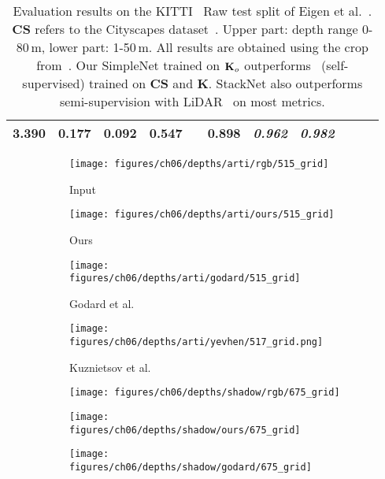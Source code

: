 \documentclass[runningheads]{llncs}
\begin{document}
\begin{table}[tb]
\begin{tabular}{lcccccccccc}
		\textbf{3.390} & \textbf{0.177} & 
		\textbf{0.092} & \textbf{0.547} && 
		\textbf{0.898} & \textit{0.962} & \textit{0.982} \\
		\hline      
	\end{tabular}
	\caption{
	Evaluation results on the KITTI~\cite{Geiger2012CVPR} Raw test split 
		of Eigen et 
		al.~\cite{eigen2014depth}. \textbf{CS} refers to the Cityscapes 
		dataset~\cite{Cordts2016Cityscapes}. Upper part: depth range 0-80\,m, 
		lower part: 1-50\,m.
All results are obtained using the crop 
		from~\cite{eigen2014depth}. Our SimpleNet trained on 
		$\text{\textbf{K}}_o$ outperforms~\cite{godard2016unsupervised} 
		(self-supervised) trained on 
		\textbf{CS} and 
		\textbf{K}. StackNet also outperforms 
		semi-supervision with LiDAR~\cite{kuznietsov2017semi} on most metrics.}
	\label{tab:6.1}
\end{table}\begin{figure}[tb]
	\centering
	\begin{subfigure}[t]{.24\textwidth}
		\centering
		\caption*{\tiny Input}
		\texttt{[image: figures/ch06/depths/arti/rgb/515\_grid]}
	\end{subfigure}
	\begin{subfigure}[t]{.24\textwidth}
		\centering
		\caption*{\tiny Ours}
		\texttt{[image: figures/ch06/depths/arti/ours/515\_grid]}
	\end{subfigure}
	\begin{subfigure}[t]{.24\textwidth}
		\centering
		\caption*{\tiny Godard et al.~\cite{godard2016unsupervised}}
		\texttt{[image: figures/ch06/depths/arti/godard/515\_grid]}
	\end{subfigure}
	\begin{subfigure}[t]{.24\textwidth}
		\centering
		\caption*{\tiny Kuznietsov et al.~\cite{kuznietsov2017semi}}
		\texttt{[image: figures/ch06/depths/arti/yevhen/517\_grid.png]}
	\end{subfigure}
	\begin{subfigure}[t]{.24\textwidth}
		\centering
		\texttt{[image: figures/ch06/depths/shadow/rgb/675\_grid]}
	\end{subfigure}
	\begin{subfigure}[t]{.24\textwidth}
		\centering
		\texttt{[image: figures/ch06/depths/shadow/ours/675\_grid]}
	\end{subfigure}
	\begin{subfigure}[t]{.24\textwidth}
		\centering
		\texttt{[image: figures/ch06/depths/shadow/godard/675\_grid]}

\end{subfigure}
\end{figure}
\end{document}
